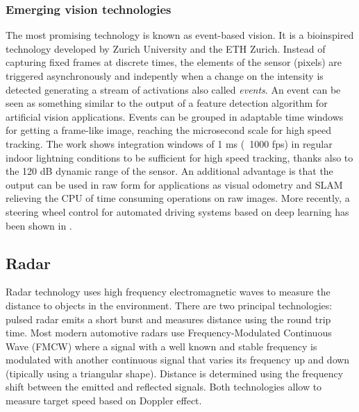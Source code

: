 

\subsubsection{Emerging vision technologies}

The most promising technology is known as event-based vision. It is a 
bioinspired technology developed by Zurich University and the ETH Zurich. 
Instead of capturing fixed frames at discrete times, the elements of the sensor
(pixels) are triggered asynchronously and indepently when a change on the
intensity is detected generating a stream of activations also called 
\emph{events}. 
An event can be seen as something similar to the output of a feature detection 
algorithm for artificial vision applications.
Events can be grouped in adaptable time windows for getting a frame-like image,
reaching the microsecond scale for high speed tracking. 
The work \cite{Mueggler2014} shows integration windows of 1 ms (~1000 fps) in
regular indoor lightning conditions to be sufficient for high speed tracking, 
thanks also to the 120 dB dynamic range of the sensor.
An additional advantage is that the output can be used in raw form for 
applications as visual odometry \cite{Censi2014} and SLAM \cite{Vidal2017}
relieving the CPU of time consuming operations on raw images.
More recently, a steering wheel control for automated driving systems 
based on deep learning has been shown in \cite{Maqueda2018}.
 
 

\subsection{Radar}

Radar technology uses high frequency electromagnetic waves to measure the
distance to objects in the environment.
There are two principal technologies: pulsed radar emits a short burst and 
measures distance using the round trip time. Most modern automotive 
radars use Frequency-Modulated Continuous Wave (FMCW) where a signal with
a well known and stable frequency is modulated with another continuous signal
that varies its frequency up and down (tipically using a triangular shape).
Distance is determined using the frequency shift between the emitted and 
reflected signals. Both technologies allow to measure target speed based
on Doppler effect.

